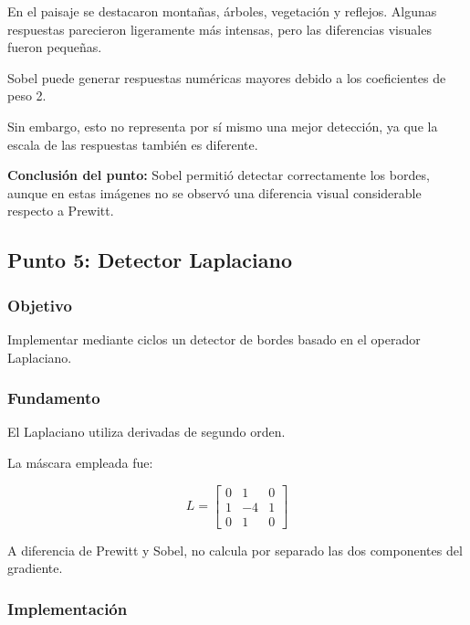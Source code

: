 \documentclass[11pt,letterpaper]{article}
\begin{document}
En el paisaje se destacaron
montañas, árboles, vegetación
y reflejos. Algunas respuestas
parecieron ligeramente más intensas,
pero las diferencias visuales
fueron pequeñas.

Sobel puede generar respuestas numéricas
mayores debido a los coeficientes
de peso 2.

Sin embargo, esto no representa
por sí mismo una mejor detección,
ya que la escala de las respuestas
también es diferente.

\textbf{Conclusión del punto:}
Sobel permitió detectar correctamente
los bordes, aunque en estas imágenes
no se observó una diferencia visual
considerable respecto a Prewitt.

\subsection{Punto 5: Detector Laplaciano}

\subsubsection*{Objetivo}

Implementar mediante ciclos
un detector de bordes basado
en el operador Laplaciano.

\subsubsection*{Fundamento}

El Laplaciano utiliza derivadas
de segundo orden.

La máscara empleada fue:

\[
L=
\begin{bmatrix}
0&1&0\\
1&-4&1\\
0&1&0
\end{bmatrix}
\]

A diferencia de Prewitt y Sobel,
no calcula por separado las dos
componentes del gradiente.

\subsubsection*{Implementación}
\end{document}
